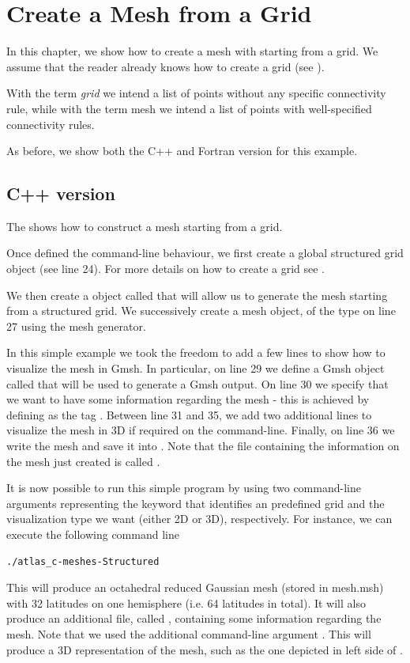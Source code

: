 \chapter{Create a Mesh from a Grid}
In this chapter, we show how to create a mesh with \Atlas 
starting from a grid. We assume that the reader already 
knows how to create a grid (see ). 
% 
\begin{notebox}
With the term \textit{grid} we intend a list of points 
without any specific connectivity rule, while with the 
term mesh we intend a list of points with well-specified 
connectivity rules.
\end{notebox}
%
As before, we show both the C++ and Fortran version 
for this example.


\section{C++ version}
The  shows how to construct a mesh 
starting from a grid.
%

%
Once defined the command-line behaviour, we first create 
a global structured grid object (see line 24). For more 
details on how to create a grid see .

We then create a 
 object called 
that will allow us to generate the mesh starting from
a structured grid.
We successively create a mesh object,  
of the  type on line 27 using the mesh generator.

In this simple example we took the freedom to add a few 
lines to show how to visualize the mesh in Gmsh. In particular, 
on line 29 we define a Gmsh object called  that 
will be used to generate a Gmsh output. On line 30 we specify 
that we want to have some information regarding the mesh - this 
is achieved by defining as  the tag .
Between line 31 and 35, we add two additional lines to visualize 
the mesh in 3D if required on the command-line.
Finally, on line 36 we write the mesh and save it into .
Note that the file containing the information on the mesh 
just created is called .

It is now possible to run this simple program by using 
two command-line arguments representing the keyword that 
identifies an \Atlas predefined grid and the visualization 
type we want (either 2D or 3D), respectively. For instance, 
we can execute the following command line
%
\begin{lstlisting}[style=BashStyle]
./atlas_c-meshes-Structured
\end{lstlisting}
% 
This will produce an octahedral reduced Gaussian mesh 
(stored in mesh.msh) with 32 latitudes on one hemisphere 
(i.e. 64 latitudes in total). It will also produce an 
additional file, called , containing
some information regarding the mesh.
Note that we used the additional command-line argument 
. This will produce a 3D representation 
of the mesh, such as the one depicted in left side of 
.


